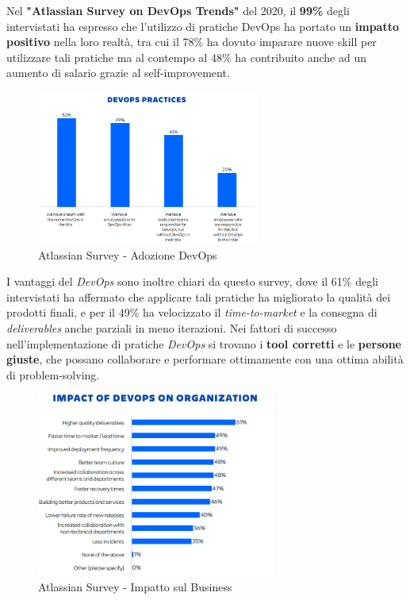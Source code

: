 \documentclass[a4paper,12pt]{report}
\begin{document}
				Nel \textbf{"Atlassian Survey on DevOps Trends"} del 2020, il \textbf{99\%} degli intervistati ha espresso che l'utilizzo di pratiche DevOps ha portato un \textbf{impatto positivo} nella loro realtà, tra cui il 78\% ha dovuto imparare nuove skill per utilizzare tali pratiche ma al contempo al 48\% ha contribuito anche ad un aumento di salario grazie al self-improvement.
			
				\begin{figure}[H]
					\centering
					\includegraphics[width=0.65\textwidth]{atlassian_devops_practices}
					\caption{Atlassian Survey - Adozione DevOps}
					\label{fig:atlassian_devops_practices}
				\end{figure}

				I vantaggi del \emph{DevOps} sono inoltre chiari da questo survey, dove il 61\% degli intervistati ha affermato che applicare tali pratiche ha migliorato la qualità dei prodotti finali, e per il 49\% ha velocizzato il \emph{time-to-market} e la consegna di \emph{deliverables} anche parziali in meno iterazioni. Nei fattori di successo nell'implementazione di pratiche \emph{DevOps} si trovano i \textbf{tool corretti} e le \textbf{persone giuste}, che possano collaborare e performare ottimamente con una ottima abilità di problem-solving.
				
				\begin{figure}[H]
					\centering
					\includegraphics[width=0.7\textwidth]{atlassian_devops_impact}
					\caption{Atlassian Survey - Impatto sul Business}
					\label{fig:atlassian_devops_impact}
				\end{figure}
				
\end{document}
